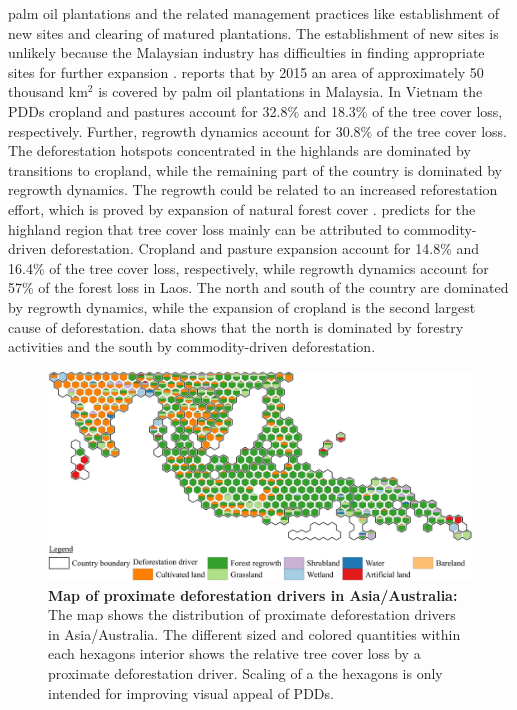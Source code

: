 palm oil plantations and the related management practices like establishment of new sites and clearing of matured plantations. The establishment of new sites is unlikely because the Malaysian industry has difficulties in finding appropriate sites for further expansion \citep{Corley2016}. \citet{Corley2016} reports that by 2015 an area of approximately 50 thousand km$^2$ is covered by palm oil plantations in Malaysia. In Vietnam the \acp{PDD} cropland and pastures account for 32.8\% and 18.3\% of the tree cover loss, respectively. Further, regrowth dynamics account for 30.8\% of the tree cover loss. The deforestation hotspots concentrated in the highlands are dominated by transitions to cropland, while the remaining part of the country is dominated by regrowth dynamics. The regrowth could be related to an increased reforestation effort, which is proved by expansion of natural forest cover \citep{Chazdon2008}. \citet{Curtis2018} predicts for the highland region that tree cover loss mainly can be attributed to commodity-driven deforestation. Cropland and pasture expansion account for 14.8\% and 16.4\% of the tree cover loss, respectively, while regrowth dynamics account for 57\% of the forest loss in Laos. The north and south of the country are dominated by regrowth dynamics, while the expansion of cropland is the second largest cause of deforestation. \citet{Curtis2018} data shows that the north is dominated by forestry activities and the south by commodity-driven deforestation.
			\begin{figure}[ht]
				\centering
				\includegraphics[scale=1]{img/asia_driver_frameless}
				\caption[Map of proximate deforestation drivers in Asia/Australia]{\textbf{Map of proximate deforestation drivers in Asia/Australia:} The map shows the distribution of proximate deforestation drivers in Asia/Australia. The different sized and colored quantities within each hexagons interior shows the relative tree cover loss by a proximate deforestation driver. Scaling of a the hexagons is only intended for improving visual appeal of \acp{PDD}.}
				\label{fig:asia_driver}
			\end{figure}

